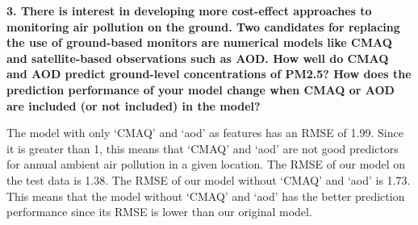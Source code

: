 \documentclass[
]{article}
\begin{document}
\textbf{3. There is interest in developing more cost-effect approaches
to monitoring air pollution on the ground. Two candidates for replacing
the use of ground-based monitors are numerical models like CMAQ and
satellite-based observations such as AOD. How well do CMAQ and AOD
predict ground-level concentrations of PM2.5? How does the prediction
performance of your model change when CMAQ or AOD are included (or not
included) in the model?}

The model with only `CMAQ' and `aod' as features has an RMSE of 1.99.
Since it is greater than 1, this means that `CMAQ' and `aod' are not
good predictors for annual ambient air pollution in a given location.
The RMSE of our model on the test data is 1.38. The RMSE of our model
without `CMAQ' and `aod' is 1.73. This means that the model without
`CMAQ' and `aod' has the better prediction performance since its RMSE is
lower than our original model.
\end{document}
